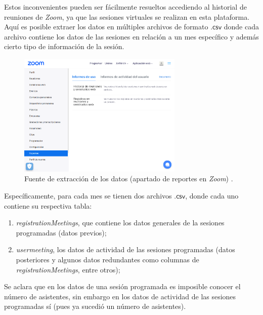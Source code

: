 \documentclass[11pt,a4paper]{book}
\theoremstyle{definition}%
\begin{document}
                Estos inconvenientes pueden ser fácilmente resueltos accediendo al historial de reuniones de \textit{Zoom}, ya que las sesiones virtuales se realizan en esta plataforma. Aquí es posible extraer los datos en múltiples archivos de formato $\mathsf{.csv}$ donde cada archivo contiene los datos de las sesiones en relación a un mes específico y además cierto tipo de información de la sesión.                
                \begin{figure}[H]
                    \centering
                    \includegraphics[width=0.7\textwidth]{Sources/zoomReport.png}
                    \caption{Fuente de extracción de los datos (apartado de reportes en \textit{Zoom}) \cite{zoom:reports}.}
                    \label{fig:zoomReport}
                \end{figure}

                Específicamente, para cada mes se tienen dos archivos $\mathsf{.csv}$, donde cada uno contiene su respectiva tabla:
                \begin{enumerate}\label{raw tables dict}
                    \item \textit{registrationMeetings}, que contiene los datos generales de la sesiones programadas (datos previos);
                    \item \textit{usermeeting}, los datos de actividad de las sesiones programadas (datos posteriores y algunos datos redundantes como columnas de \textit{registrationMeetings}, entre otros);
                \end{enumerate}
                
                Se aclara que en los datos de una sesión programada es imposible conocer el número de asistentes, sin embargo en los datos de actividad de las sesiones programadas sí (pues ya sucedió un número de asistentes).
    
\end{document}
